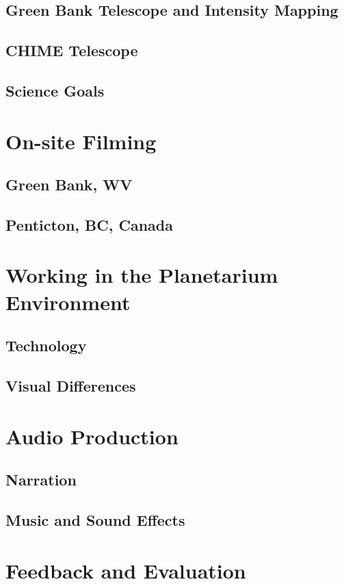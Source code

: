 \subsection{Green Bank Telescope and Intensity Mapping}
\subsection{CHIME Telescope}
\subsection{Science Goals}

\section{On-site Filming}

\subsection{Green Bank, WV}
\subsection{Penticton, BC, Canada}

\section{Working in the Planetarium Environment}

\subsection{Technology}
\subsection{Visual Differences}

\section{Audio Production}

\subsection{Narration}
\subsection{Music and Sound Effects}

\section{Feedback and Evaluation}

